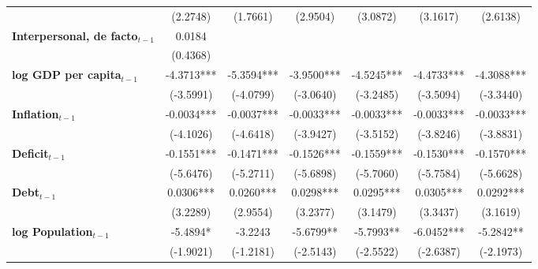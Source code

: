 \begin{center}
\begin{tabular}{lcccccc}
\textbf{ }                         &      (2.2748)      &      (1.7661)      &      (2.9504)      &      (3.0872)      &      (3.1617)      &      (2.6138)       \\
\textbf{Interpersonal, de facto$_{t-1}$}           &       0.0184       &                    &                    &                    &                    &                     \\
\textbf{ }                         &      (0.4368)      &                    &                    &                    &                    &                     \\
\textbf{log GDP per capita$_{t-1}$}           &     -4.3713***     &     -5.3594***     &     -3.9500***     &     -4.5245***     &     -4.4733***     &     -4.3088***      \\
\textbf{ }                         &     (-3.5991)      &     (-4.0799)      &     (-3.0640)      &     (-3.2485)      &     (-3.5094)      &     (-3.3440)       \\
\textbf{Inflation$_{t-1}$}      &     -0.0034***     &     -0.0037***     &     -0.0033***     &     -0.0033***     &     -0.0033***     &     -0.0033***      \\
\textbf{ }                         &     (-4.1026)      &     (-4.6418)      &     (-3.9427)      &     (-3.5152)      &     (-3.8246)      &     (-3.8831)       \\
\textbf{Deficit$_{t-1}$}             &     -0.1551***     &     -0.1471***     &     -0.1526***     &     -0.1559***     &     -0.1530***     &     -0.1570***      \\
\textbf{ }                         &     (-5.6476)      &     (-5.2711)      &     (-5.6898)      &     (-5.7060)      &     (-5.7584)      &     (-5.6628)       \\
\textbf{Debt$_{t-1}$}                &     0.0306***      &     0.0260***      &     0.0298***      &     0.0295***      &     0.0305***      &     0.0292***       \\
\textbf{ }                         &      (3.2289)      &      (2.9554)      &      (3.2377)      &      (3.1479)      &      (3.3437)      &      (3.1619)       \\
\textbf{log Population$_{t-1}$}      &      -5.4894*      &      -3.2243       &     -5.6799**      &     -5.7993**      &     -6.0452***     &     -5.2842**       \\
\textbf{ }                         &     (-1.9021)      &     (-1.2181)      &     (-2.5143)      &     (-2.5522)      &     (-2.6387)      &     (-2.1973)       \\

\end{tabular}
\end{center}
